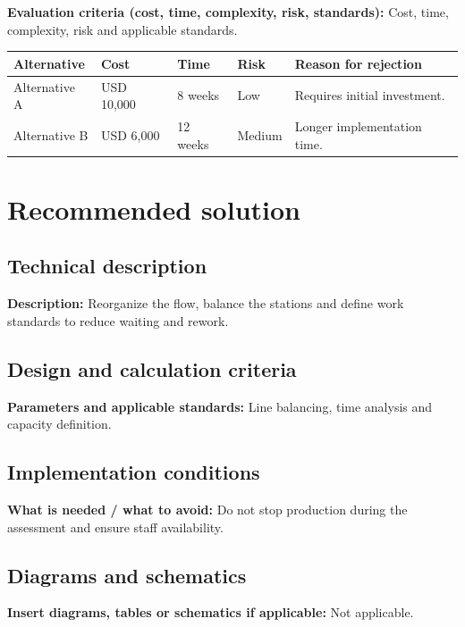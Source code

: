 \documentclass[11pt,a4paper]{article}
\newcommand{\campo}[2]{\noindent\textbf{\textcolor{irdblack}{#1:}} \textcolor{irdblack}{#2}\par\vspace{0.3em}}
\begin{document}
\campo{Evaluation criteria (cost, time, complexity, risk, standards)}{Cost, time, complexity, risk and applicable standards.}

\vspace{0.5cm}

\begin{center}
\renewcommand{\arraystretch}{1.4}
\begin{tabular}{@{}p{3cm}p{2.2cm}p{2.2cm}p{2.2cm}>{\raggedright\arraybackslash}p{4.4cm}@{}}
\toprule
\textbf{\color{irdblack}Alternative} & \textbf{\color{irdblack}Cost} & \textbf{\color{irdblack}Time} & \textbf{\color{irdblack}Risk} & \textbf{\color{irdblack}Reason for rejection} \\
\midrule
Alternative A & USD 10,000 & 8 weeks & Low & Requires initial investment. \\
\addlinespace
Alternative B & USD 6,000 & 12 weeks & Medium & Longer implementation time. \\
\bottomrule
\end{tabular}
\end{center}

\section{Recommended solution}

\subsection{Technical description}
\campo{Description}{Reorganize the flow, balance the stations and define work standards to reduce waiting and rework.}

\subsection{Design and calculation criteria}
\campo{Parameters and applicable standards}{Line balancing, time analysis and capacity definition.}

\subsection{Implementation conditions}
\campo{What is needed / what to avoid}{Do not stop production during the assessment and ensure staff availability.}

\subsection{Diagrams and schematics}
\campo{Insert diagrams, tables or schematics if applicable}{Not applicable.}
\end{document}
